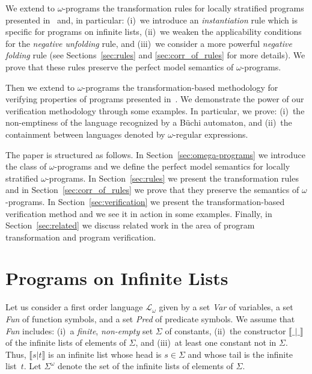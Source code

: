 \documentclass[english]{tlp}
\begin{document}
We extend to
$\omega$-programs the transformation 
rules for locally stratified programs presented
in~\cite{Fi&04a,PeP00a,Ro&02,Sek91,Sek09} and, 
in particular: (i)~we introduce
an {\em instantiation\/} rule which is specific for programs on
infinite lists, (ii)~we weaken the applicability conditions for
the {\em  negative unfolding\/} rule, and 
(iii)~we consider a more powerful {\em negative
folding\/} rule (see Sections~\ref{sec:rules} and \ref{sec:corr_of_rules}
for more details).
We prove that these rules preserve
the perfect model semantics of $\omega$-programs.

Then we extend to $\omega$-programs the transformation-based
methodology for verifying properties of programs presented in~\cite{PeP00a}.
We  demonstrate the power of our verification methodology
through some examples. In particular, we prove: (i)~the non-emptiness of the
language recognized by a B\"uchi automaton,
 and (ii)~the containment between languages
denoted by $\omega$-regular expressions.

The paper is structured as follows. In
Section~\ref{sec:omega-programs} we introduce the class of 
\mbox{$\omega$-pro}{\-grams} and we define the perfect model semantics for locally stratified
\mbox{$\omega$-programs}. In Section~\ref{sec:rules} we present the transformation rules
and in Section~\ref{sec:corr_of_rules} we prove that they preserve the  semantics of $\omega$-programs. In Section~\ref{sec:verification} we
present the transformation-based verification method and we see it in action in
some examples. Finally, in Section~\ref{sec:related} we discuss related work in
the area of program transformation and program verification.



\section{Programs on Infinite Lists
\label{sec:omega-programs}}

Let us consider a first order language $\mathcal{L}_{\omega}$ given
by a set {\it{Var}} of variables, a set {\it{Fun}} of function
symbols, and a set {\it{Pred}} of predicate symbols. We assume that
{\it{Fun}} includes: (i)~a {\em finite}, {\em non-empty} set $\Sigma$ of
constants, (ii)~the constructor $\llbracket
\_|\_\rrbracket $ of the infinite lists of
elements of $\Sigma$, and (iii)~at least one constant not in 
$\Sigma$. Thus, $\llbracket s|t\rrbracket $ is an
infinite list whose head is $s\in \Sigma$ and whose tail is the
infinite list~$t$. Let $\Sigma^{\omega}$ denote the set of the
infinite lists of elements of $\Sigma$.
\end{document}
